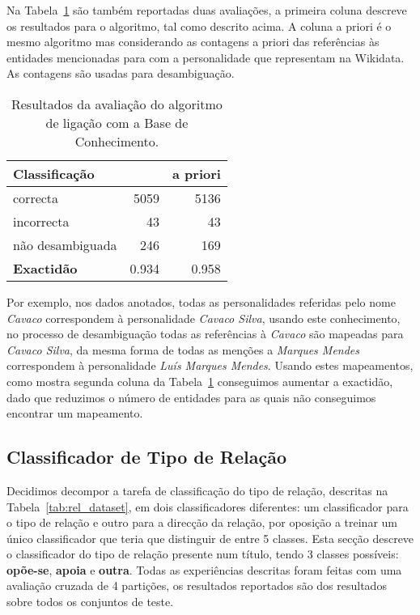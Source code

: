 \documentclass[a4paper, twocolumn, 11pt, twoside]{article}
\begin{document}
Na Tabela~\ref{tab:ent_linking_results} são também reportadas duas avaliações, a primeira coluna descreve os resultados para o algoritmo, tal como descrito acima. A coluna a priori é o mesmo algoritmo mas considerando as contagens a priori das referências às entidades mencionadas para com a personalidade que representam na Wikidata. As contagens são usadas para desambiguação. 

\begin{table}[!h]
    \begin{center}
    \begin{tabular}{l rr}
        {\bf Classificação} &               & {\bf a priori} \\
        \hline
        correcta            &   5059        &  5136    \\
        incorrecta          &     43        &    43    \\
		não desambiguada    &    246        &   169    \\    
        \hline
		{\bf Exactidão }    &  0.934	    &  0.958   \\
    \end{tabular}
	\caption{Resultados da avaliação do algoritmo de ligação com a Base de Conhecimento.}
	\label{tab:ent_linking_results}
	\end{center}
\end{table}


Por exemplo, nos dados anotados, todas as personalidades referidas pelo nome \textit{Cavaco} correspondem à personalidade \textit{Cavaco Silva}, usando este conhecimento, no processo de desambiguação todas as referências à \textit{Cavaco} são mapeadas para \textit{Cavaco Silva}, da mesma forma de todas as menções a \textit{Marques Mendes} correspondem à personalidade \textit{Luís Marques Mendes}. Usando estes mapeamentos, como mostra segunda coluna da Tabela~\ref{tab:ent_linking_results} conseguimos aumentar a exactidão, dado que reduzimos o número de entidades para as quais não conseguimos encontrar um mapeamento.

\subsection{Classificador de Tipo de Relação}
\label{subsec:rel_classifier}

Decidimos decompor a tarefa de classificação do tipo de relação, descritas na Tabela~\ref{tab:rel_dataset}, em dois classificadores diferentes: um classificador para o tipo de relação e outro para a direcção da relação, por oposição a treinar um único classificador que teria que distinguir de entre 5 classes. Esta secção descreve o classificador do tipo de relação presente num título, tendo 3 classes possíveis: \textbf{opõe-se}, \textbf{apoia} e \textbf{outra}. Todas as experiências descritas foram feitas com uma avaliação cruzada de 4 partições, os resultados reportados são dos resultados sobre todos os conjuntos de teste.
\end{document}
